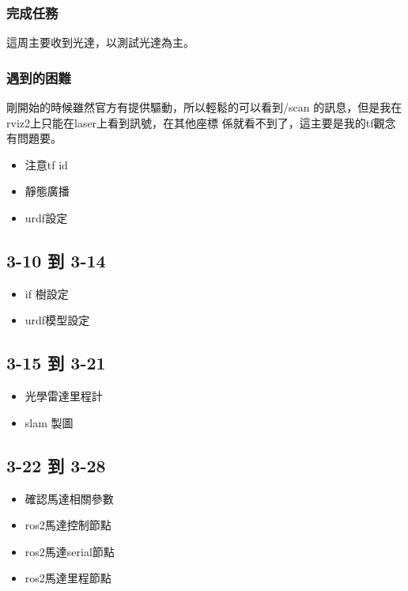\subsubsection{完成任務}
這周主要收到光達，以測試光達為主。

\subsubsection{遇到的困難}
剛開始的時候雖然官方有提供驅動，所以輕鬆的可以看到/scan
的訊息，但是我在rviz2上只能在laser上看到訊號，在其他座標
係就看不到了，這主要是我的tf觀念有問題要。

\begin{itemize}
    \item 注意tf id
    \item 靜態廣播
    \item urdf設定
\end{itemize}
\subsection{3-10 到 3-14}
\begin{itemize}
    \item if 樹設定
    \item urdf模型設定
\end{itemize}
\subsection{3-15 到 3-21}
\begin{itemize}
    \item 光學雷達里程計 
    \item slam 製圖
\end{itemize}
\subsection{3-22 到 3-28}
\begin{itemize}
    \item 確認馬達相關參數
    \item ros2馬達控制節點
    \item ros2馬達serial節點
    \item ros2馬達里程節點
\end{itemize}

